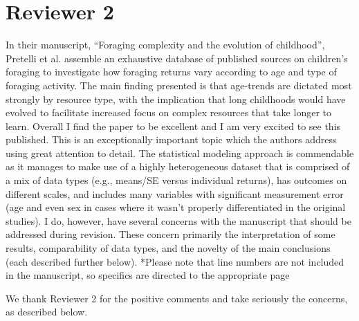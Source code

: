 \documentclass{article}
\newcommand{\rev}[1]{{\color{ForestGreen}#1}}
\begin{document}
\section{Reviewer 2}
In their manuscript, “Foraging complexity and the evolution of childhood”, Pretelli et al.  assemble an exhaustive database of published sources on children's foraging to investigate how  foraging returns vary according to age and type of foraging activity. The main finding presented  is that age-trends are dictated most strongly by resource type, with the implication that long  childhoods would have evolved to facilitate increased focus on complex resources that take  longer to learn. Overall I find the paper to be excellent and I am very excited to see this  published. This is an exceptionally important topic which the authors address using great  attention to detail. The statistical modeling approach is commendable as it manages to make use  of a highly heterogeneous dataset that is comprised of a mix of data types (e.g., means/SE versus  individual returns), has outcomes on different scales, and includes many variables with  significant measurement error (age and even sex in cases where it wasn't properly differentiated  in the original studies).  I do, however, have several concerns with the manuscript that should be addressed during  revision. These concern primarily the interpretation of some results, comparability of data types,  and the novelty of the main conclusions (each described further below).
*Please note that line numbers are not included in the manuscript, so specifics are directed to the 
appropriate page

\rev{We thank Reviewer 2 for the positive comments and take seriously the concerns, as described below.}
\end{document}
